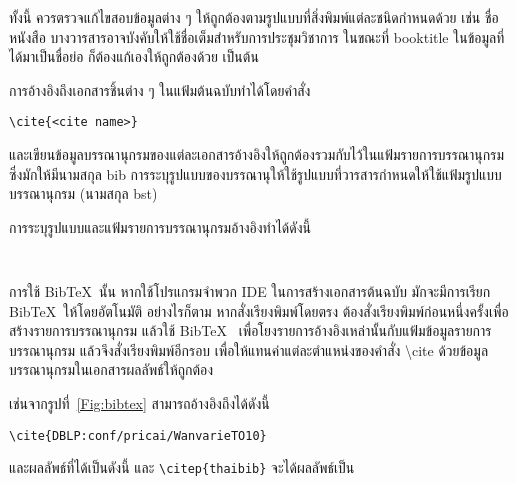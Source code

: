 ทั้งนี้ ควรตรวจแก้ไขสอบข้อมูลต่าง ๆ ให้ถูกต้องตามรูปแบบที่สิ่งพิมพ์แต่ละชนิดกำหนดด้วย เช่น ชื่อหนังสือ บางวารสารอาจบังคับให้ใช้ชื่อเต็มสำหรับการประชุมวิชาการ ในขณะที่ booktitle ในข้อมูลที่ได้มาเป็นชื่อย่อ ก็ต้องแก้เองให้ถูกต้องด้วย เป็นต้น


การอ้างอิงถึงเอกสารชิ้นต่าง ๆ ในแฟ้มต้นฉบับทำได้โดยคำสั่ง
\begin{lstlisting}[numbers=none]
\cite{<cite name>}
\end{lstlisting}

และเขียนข้อมูลบรรณานุกรมของแต่ละเอกสารอ้างอิงให้ถูกต้องรวมกับไว้ในแฟ้มรายการบรรณานุกรม ซึ่งมักให้มีนามสกุล bib การระบุรูปแบบของบรรณานุให้ใช้รูปแบบที่วารสารกำหนดให้ใช้แฟ้มรูปแบบบรรณานุกรม (นามสกุล bst)

การระบุรูปแบบและแฟ้มรายการบรรณานุกรมอ้างอิงทำได้ดังนี้
\begin{lstlisting}[numbers=none]


\end{lstlisting}

การใช้ Bib\TeX~นั้น หากใช้โปรแกรมจำพวก IDE ในการสร้างเอกสารต้นฉบับ มักจะมีการเรียก Bib\TeX~ให้โดยอัตโนมัติ อย่างไรก็ตาม หากสั่งเรียงพิมพ์โดยตรง ต้องสั่งเรียงพิมพ์ก่อนหนึ่งครั้งเพื่อสร้างรายการบรรณานุกรม แล้วใช้ Bib\TeX~ เพื่อโยงรายการอ้างอิงเหล่านั้นกับแฟ้มข้อมูลรายการบรรณานุกรม แล้วจึงสั่งเรียงพิมพ์อีกรอบ เพื่อให้แทนค่าแต่ละตำแหน่งของคำสั่ง \textbackslash cite ด้วยข้อมูลบรรณานุกรมในเอกสารผลลัพธ์ให้ถูกต้อง

เช่นจากรูปที่~\ref{Fig:bibtex} สามารถอ้างอิงถึงได้ดังนี้
\begin{lstlisting}[numbers=none]
\cite{DBLP:conf/pricai/WanvarieTO10}
\end{lstlisting}
และผลลัพธ์ที่ได้เป็นดังนี้ \cite{DBLP:conf/pricai/WanvarieTO10} และ \lstinline|\citep{thaibib}| จะได้ผลลัพธ์เป็น \citep{thaibib}

